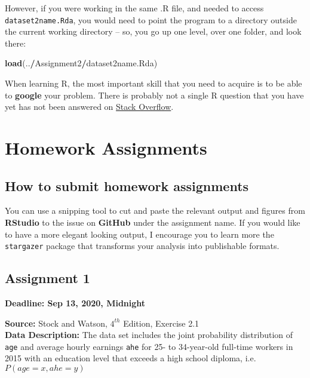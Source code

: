 \documentclass[
]{book}
\newenvironment{Shaded}{\begin{snugshade}}{\end{snugshade}}
\newcommand{\KeywordTok}[1]{\textcolor[rgb]{0.13,0.29,0.53}{\textbf{#1}}}
\newcommand{\NormalTok}[1]{#1}
\newcommand{\OperatorTok}[1]{\textcolor[rgb]{0.81,0.36,0.00}{\textbf{#1}}}
\begin{document}
However, if you were working in the same .R file, and needed to access \texttt{dataset2name.Rda}, you would need to point the program to a directory outside the current working directory -- so, you go up one level, over one folder, and look there:

\begin{Shaded}
\begin{Highlighting}[]
\KeywordTok{load}\NormalTok{(..}\OperatorTok{/}\NormalTok{Assignment2}\OperatorTok{/}\NormalTok{dataset2name.Rda)}
\end{Highlighting}
\end{Shaded}

When learning R, the most important skill that you need to acquire is to be able to \textbf{google} your problem. There is probably not a single R question that you have yet has not been answered on \href{https://stackoverflow.com/}{Stack Overflow}.

\hypertarget{homework-assignments}{%
\chapter{Homework Assignments}\label{homework-assignments}}

\hypertarget{how-to-submit-homework-assignments}{%
\section{How to submit homework assignments}\label{how-to-submit-homework-assignments}}

You can use a snipping tool to cut and paste the relevant output and figures from \textbf{RStudio} to the issue on \textbf{GitHub} under the assignment name. If you would like to have a more elegant looking output, I encourage you to learn more the \texttt{stargazer} package that transforms your analysis into publishable formats.

\hypertarget{assignment-1}{%
\section{Assignment 1}\label{assignment-1}}

\textbf{Deadline: Sep 13, 2020, Midnight}

\textbf{Source:} Stock and Watson, \(4^{th}\) Edition, Exercise 2.1\\
\textbf{Data Description:} The data set includes the joint probability distribution of \texttt{age} and average hourly earnings \texttt{ahe} for 25- to 34-year-old full-time workers in 2015 with an education level that exceeds a high school diploma, i.e.~\(P(age=x,ahe=y)\)
\end{document}
